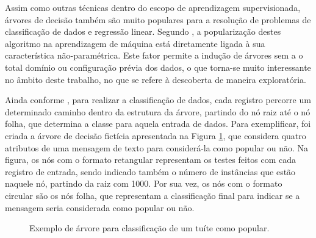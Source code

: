 \documentclass[oneside,openright,12pt]{ufsm_2015} %
\begin{document}
    \par Assim como outras técnicas dentro do escopo de aprendizagem supervisionada, árvores de decisão também são muito populares para a resolução de problemas de classificação de dados e regressão linear. Segundo \cite{book:han:11}, a popularização destes algoritmo na aprendizagem de máquina está diretamente ligada à sua característica não-paramétrica. Este fator permite a indução de árvores sem a o total domínio ou configuração prévia dos dados, o que torna-se muito interessante no âmbito deste trabalho, no que se refere à descoberta de maneira exploratória.
    
    \par Ainda conforme \cite{book:han:11}, para realizar a classificação de dados, cada registro percorre um determinado caminho dentro da estrutura da árvore, partindo do nó raiz até o nó folha, que determina a classe para aquela entrada de dados. Para exemplificar, foi criada a árvore de decisão fictícia apresentada na Figura \ref{fig:exemplo_arvore}, que considera quatro atributos de uma mensagem de texto para considerá-la como popular ou não. Na figura, os nós com o formato retangular representam os testes feitos com cada registro de entrada, sendo indicado também o número de instâncias que estão naquele nó, partindo da raiz com 1000. Por sua vez, os nós com o formato circular são os nós folha, que representam a classificação final para indicar se a mensagem seria considerada como popular ou não.
    
    \begin{figure}[ht]
    \caption{Exemplo de árvore para classificação de um tuíte como popular.}
    \centering
    \label{fig:exemplo_arvore}
    \end{figure}
    
\end{document}
